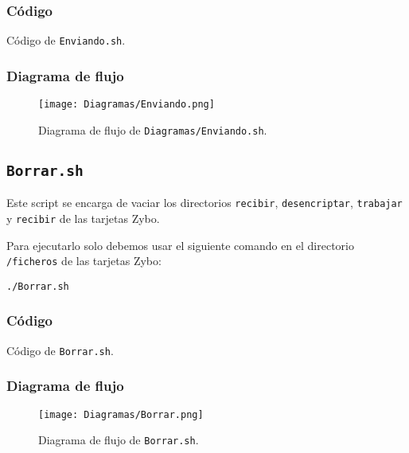 \documentclass[12pt,letterpaper]{article}
\begin{document}
\subsubsection{Código}

\begin{center}
	Código de \texttt{Enviando.sh}.
\end{center}

\newpage
\subsubsection{Diagrama de flujo}
\begin{figure}[h]
	\centering
	\texttt{[image: Diagramas/Enviando.png]}
	\caption{Diagrama de flujo de \texttt{Diagramas/Enviando.sh}.}
	\label{Diagrama de flujo de Enviando.sh}
\end{figure}


\subsection{\texttt{Borrar.sh}}
Este script se encarga de vaciar los directorios \texttt{recibir}, \texttt{desencriptar}, \texttt{trabajar} y \texttt{recibir} de las tarjetas Zybo.

Para ejecutarlo solo debemos usar el siguiente comando en el directorio \texttt{/ficheros} de las tarjetas Zybo:
\begin{center}
	\texttt{./Borrar.sh}
\end{center}

\subsubsection{Código}

\begin{center}
	Código de \texttt{Borrar.sh}.
\end{center}

\subsubsection{Diagrama de flujo}
\begin{figure}[h]
	\centering
	\texttt{[image: Diagramas/Borrar.png]}
	\caption{Diagrama de flujo de \texttt{Borrar.sh}.}
	\label{Diagrama de flujo de Borrar.sh}
\end{figure}




\end{document}
